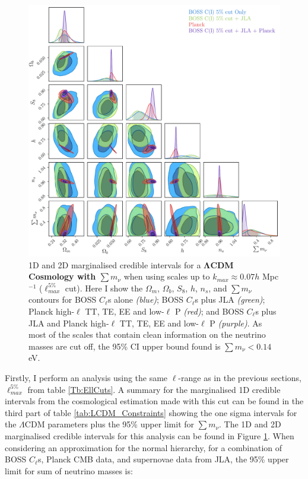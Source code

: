 \begin{figure}
\begin{center}
\includegraphics[width=\textwidth]{BOSS-FIGS/1Spec_Neutrino_NewPrior_LCDM_5pc.pdf}
\caption[1D and 2D marginalised credible intervals for a $\Lambda$CDM Cosmology with $\sum m_{\nu}$ when using scales up to $k_{max}\approx 0.07 h$ Mpc$^{-1}$]{1D and 2D marginalised credible intervals for a \textbf{$\mathbf{\Lambda}$CDM Cosmology with $\sum m_{\nu}$} when using scales up to $k_{max}\approx 0.07 h$ Mpc$^{-1}$ ($\ell_{max}^{5\%}$ cut). Here I show the $\Omega_m$, $\Omega_b$, $S_8$, $h$, $n_s$, and $\sum m_{\nu}$ contours for BOSS $C_{\ell}$s alone \textit{(blue)}; BOSS $C_{\ell}$s plus JLA \textit{(green)}; Planck high-$\ell$ TT, TE, EE and low-$\ell$ P \textit{(red)}; and BOSS $C_{\ell}$s plus JLA and Planck high-$\ell$ TT, TE, EE and low-$\ell$ P \textit{(purple)}. As most of the scales that contain clean information on the neutrino masses are cut off, the 95\% CI upper bound found is $\sum m_{\nu} < 0.14$ eV.}
\label{fig:nuCDM5pc}
\end{center}
\end{figure}

\qquad Firstly, I perform an analysis using the same $\ell$-range as in the previous sections, $\ell_{max}^{5\%}$ from table \ref{Tb:EllCuts}. A summary for the marginalised 1D credible intervals from the cosmological estimation made with this cut can be found in the third part of table \ref{tab:LCDM_Constraints} showing the one sigma intervals for the $\Lambda$CDM parameters plus the 95\% upper limit for $\sum m_{\nu}$. The 1D and 2D marginalised credible intervals for this analysis can be found in Figure \ref{fig:nuCDM5pc}. When considering an approximation for the normal hierarchy, for a combination of BOSS $C_{\ell}$s, Planck CMB data, and supernovae data from JLA, the 95\% upper limit for sum of neutrino masses is:

